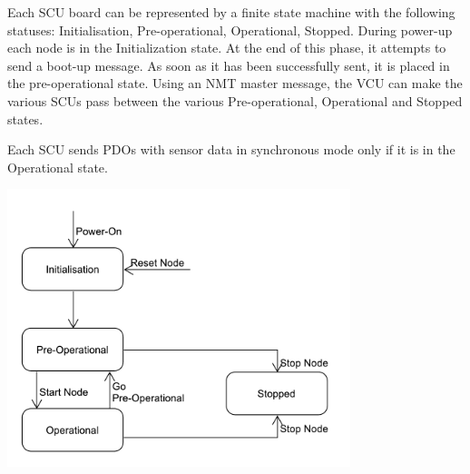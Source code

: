 Each S\+CU board can be represented by a finite state machine with the following statuses\+: Initialisation, Pre-\/operational, Operational, Stopped. During power-\/up each node is in the Initialization state. At the end of this phase, it attempts to send a boot-\/up message. As soon as it has been successfully sent, it is placed in the pre-\/operational state. Using an N\+MT master message, the V\+CU can make the various S\+C\+Us pass between the various Pre-\/operational, Operational and Stopped states.

Each S\+CU sends P\+D\+Os with sensor data in synchronous mode only if it is in the Operational state.

 
\begin{DoxyImage}
\includegraphics[width=10cm]{fsm_diagram}
\end{DoxyImage}
 